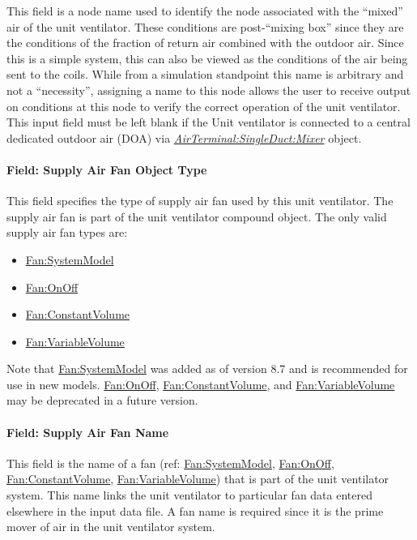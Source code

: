 This field is a node name used to identify the node associated with the ``mixed'' air of the unit ventilator. These conditions are post-``mixing box'' since they are the conditions of the fraction of return air combined with the outdoor air. Since this is a simple system, this can also be viewed as the conditions of the air being sent to the coils. While from a simulation standpoint this name is arbitrary and not a ``necessity'', assigning a name to this node allows the user to receive output on conditions at this node to verify the correct operation of the unit ventilator. This input field must be left blank if the Unit ventilator is connected to a central dedicated outdoor air (DOA) via \textit{\hyperref[airterminalsingleductmixer]{AirTerminal:SingleDuct:Mixer}} object.

\paragraph{Field: Supply Air Fan Object Type}\label{field-supply-air-fan-object-type-1-000}

This field specifies the type of supply air fan used by this unit ventilator. The supply air fan is part of the unit ventilator compound object. The only valid supply air fan types are:

\begin{itemize}
\item
  \hyperref[fansystemmodel]{Fan:SystemModel}
\item
  \hyperref[fanonoff]{Fan:OnOff}
\item
  \hyperref[fanconstantvolume]{Fan:ConstantVolume}
\item
  \hyperref[fanvariablevolume]{Fan:VariableVolume}
\end{itemize}

Note that \hyperref[fansystemmodel]{Fan:SystemModel} was added as of version 8.7 and is recommended for use in new models.  \hyperref[fanonoff]{Fan:OnOff}, \hyperref[fanconstantvolume]{Fan:ConstantVolume}, and \hyperref[fanvariablevolume]{Fan:VariableVolume} may be deprecated in a future version.

\paragraph{Field: Supply Air Fan Name}\label{field-supply-air-fan-name-1-000}

This field is the name of a fan (ref: \hyperref[fansystemmodel]{Fan:SystemModel}, \hyperref[fanonoff]{Fan:OnOff}, \hyperref[fanconstantvolume]{Fan:ConstantVolume}, \hyperref[fanvariablevolume]{Fan:VariableVolume}) that is part of the unit ventilator system. This name links the unit ventilator to particular fan data entered elsewhere in the input data file. A fan name is required since it is the prime mover of air in the unit ventilator system.

